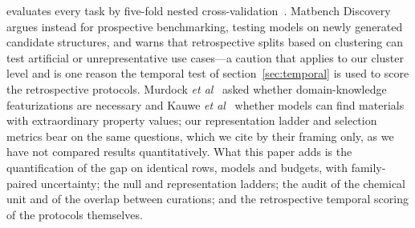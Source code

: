 \documentclass{iopjournal}
\newcommand{\etal}{\textit{et al}}
\begin{document}
evaluates every task by five-fold nested cross-validation~\cite{dunn2020}. Matbench
Discovery~\cite{riebesell2024} argues instead for prospective benchmarking, testing models on newly
generated candidate structures, and warns that retrospective splits based on clustering can test
artificial or unrepresentative use cases---a caution that applies to our cluster level and is one
reason the temporal test of section~\ref{sec:temporal} is used to score the retrospective protocols. Murdock \etal~\cite{murdock2020} asked whether domain-knowledge featurizations are necessary and Kauwe \etal~\cite{kauwe2020} whether models can find materials with extraordinary property values; our representation ladder and selection metrics bear on the same questions, which we cite by their framing only, as we have not compared results quantitatively. What this paper adds is the
quantification of the gap on identical rows, models and budgets, with family-paired uncertainty;
the null and representation ladders; the audit of the chemical unit and of the overlap between
curations; and the retrospective temporal scoring of the protocols themselves.
\end{document}
